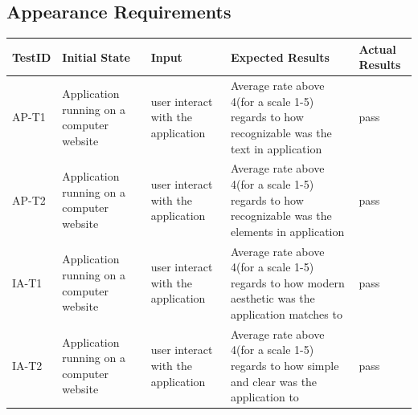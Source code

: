 \documentclass[12pt, titlepage]{article}
\begin{document}
\subsection{Appearance Requirements}
\begin{tabular}{ |p{2cm}| p{3cm} |p{4cm}| p{4cm}|p{2cm}|   } 
 \hline
 TestID & Initial State & Input & Expected Results & Actual Results\\ 
 \hline
 AP-T1 & Application running on a computer website & user interact with the application & Average rate above 4(for a scale 1-5) regards to how recognizable was the text in application  & pass\\
  \hline
 AP-T2 & Application running on a computer website & user interact with the application & Average rate above 4(for a scale 1-5) regards to how recognizable was the elements in application  & pass\\
  \hline
 IA-T1 & Application running on a computer website & user interact with the application & Average rate above 4(for a scale 1-5) regards to how modern aesthetic was the application matches to & pass\\
   \hline
 IA-T2 & Application running on a computer website & user interact with the application & Average rate above 4(for a scale 1-5) regards to how simple and clear was the application to & pass\\
 \hline
 \end{tabular}
\end{document}
